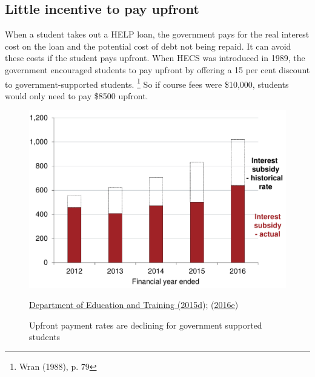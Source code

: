 \documentclass[embargoed]{grattan}
\begin{document}
\subsection{Little incentive to pay upfront}\label{subsec:little-incentive-to-pay-upfront}

When a student takes out a \gls{HELP} loan, the government pays for the real interest cost on the loan and the potential cost of debt not being repaid.
It can avoid these costs if the student pays upfront.
When \gls{HECS} was introduced in 1989, the government encouraged students to pay upfront by offering a 15 per cent discount to government-supported students.%
\footnote{Wran (1988), p. 79} So if course fees were \$10,000, students would only need to pay \$8500 upfront.

\begin{figure}
\caption{Upfront payment rates are declining for government supported students}\label{fig:fig6-upfront-payment-rates-are-declining-for-govt-supported-students}

\includegraphics[page=6]{atlas/Chartpack.pdf}

{\protect\hyperlink{_ENREF_27}{Department of Education and Training (2015d}); \protect\hyperlink{_ENREF_33}{(2016e})}
\end{figure}
\end{document}
